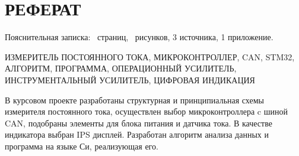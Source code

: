\begin{sloppypar} %
\newpage %
\section*{РЕФЕРАТ} %

Пояснительная записка: \pageref*{LastPage}~страниц, \totfig~рисунков, 3 источника, 1 приложение.


ИЗМЕРИТЕЛЬ ПОСТОЯННОГО ТОКА, МИКРОКОНТРОЛЛЕР, CAN,  STM32, АЛГОРИТМ, ПРОГРАММА, ОПЕРАЦИОННЫЙ УСИЛИТЕЛЬ, ИНСТРУМЕНТАЛЬНЫЙ УСИЛИТЕЛЬ, ЦИФРОВАЯ ИНДИКАЦИЯ



В курсовом проекте разработаны структурная и принципиальная схемы измерителя постоянного тока,  осуществлен выбор микроконтроллера c шиной CAN, подобраны элементы для блока питания и датчика тока. В качестве индикатора выбран IPS дисплей. Разработан алгоритм анализа данных и программа на языке Си, реализующая его.

\end{sloppypar}

